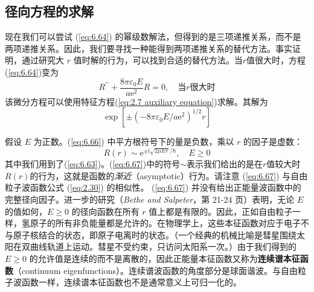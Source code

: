 \subsection*{径向方程的求解}
   现在我们可以尝试 (\ref{eq:6.64}) 的幂级数解法，但得到的是三项递推关系，而不是两项递推关系。因此，我们要寻找一种能得到两项递推关系的替代方法。事实证明，通过研究大 $r$ 值时解的行为，可以找到合适的替代方法。当$r$值很大时，方程(\ref{eq:6.64})变为
   \begin{equation}
        R^{\prime\prime} + \frac{8\pi\varepsilon_0E}{a\mathrm{e}^2}R = 0, \quad \text{当}r\text{很大时}
        \label{eq:6.65}
   \end{equation}
   该微分方程可以使用特征方程(\ref{eq:2.7 auxiliary equation})求解。其解为
   \begin{equation}
        \exp\left[\pm\left(-8\pi\varepsilon_0E/a\mathrm{e}^2\right)^{1/2}r\right]
        \label{eq:6.66}
   \end{equation}

   假设 $E$ 为正数。(\ref{eq:6.66}) 中平方根符号下的量是负数，乘以 $r$ 的因子是虚数：
   \begin{equation}
        R\left(r\right) \sim \mathrm{e}^{\pm \mathrm{i}\sqrt{2\mu Er}/\hbar}, \quad E \geq 0
        \label{eq:6.67}
   \end{equation}
   其中我们用到了(\ref{eq:6.63})。(\ref{eq:6.67})中的符号$\sim$表示我们给出的是在$r$值较大时$R\left(r\right)$的行为，这就是函数的\textit{渐近}（asymptotic）行为。请注意 (\ref{eq:6.67}) 与自由粒子波函数公式 (\ref{eq:2.30}) 的相似性。 (\ref{eq:6.67}) 并没有给出正能量波函数中的完整径向因子。进一步的研究（\textit{Bethe and Salpeter}，第 21-24 页）表明，无论 $E$ 的值如何，$E \geq 0$ 的径向函数在所有 $r$ 值上都是有限的。因此，正如自由粒子一样，氢原子的所有非负能量都是允许的。在物理学上，这些本征函数对应于电子不与原子核结合的状态，即原子电离时的状态。（一个经典的机械比喻是彗星围绕太阳在双曲线轨道上运动。彗星不受约束，只访问太阳系一次。）由于我们得到的 $E \geq 0$ 的允许值是连续的而不是离散的，因此正能量本征函数又称为\textbf{连续谱本征函数}（continuum eigenfunctions）。连续谱波函数的角度部分是球面谐波。与自由粒子波函数一样，连续谱本征函数也不是通常意义上可归一化的。

